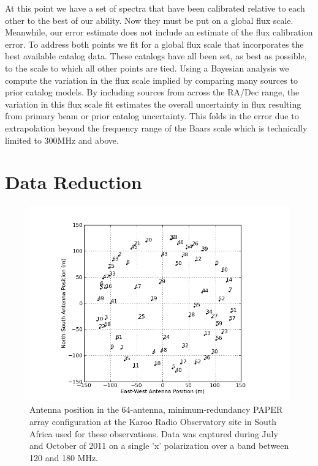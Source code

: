 \documentclass[preprint]{aastex}
\begin{document}
At this point we have a set of spectra that have been calibrated relative to each other to the best of our ability. Now 
they must be put on a global flux scale. Meanwhile, our error estimate does not include an estimate of the 
flux calibration error.  To address both points we fit for a global flux scale that incorporates the best available
catalog data. These catalogs
have all been set, as best as possible, to the \citet{Baars:1977p9678} scale to which all other points are tied. Using a Bayesian analysis we compute the 
variation in the flux scale implied by comparing many sources to prior catalog models. By including sources from across
the RA/Dec range, the variation in this flux scale fit estimates the overall uncertainty in flux resulting from primary beam 
or prior catalog uncertainty.  This folds in the error due to extrapolation beyond the frequency range of the Baars scale which is
technically limited to 300MHz and above.

 
 \section{Data Reduction}
 \label{sec:Observations}

\begin{figure}\centering
\includegraphics[width=0.85\columnwidth]{plots/antpos.png}
\caption{Antenna position in the 64-antenna, minimum-redundancy PAPER array configuration at the Karoo Radio Observatory site in South Africa used for these observations.
Data was captured during July and October of 2011 on a single 'x' polarization over a band between 120 and 180 MHz.
}\label{fig:antpos}
\end{figure}
\end{document}
